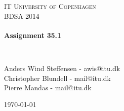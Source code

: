 


%


\begin{center}
\thispagestyle{empty}


\textsc{\LARGE IT University of Copenhagen}\\[1.5cm]

\textsc{\Large BDSA 2014 }\\[0.5cm]

\HRule \\[0.4cm]
{ \huge \bfseries Assignment 35.1 \\ [0.1cm]
    }

\HRule \\[1.5cm]

\begin{minipage}{1\textwidth}
\begin{center} \large
Anders Wind Steffensen - awis@itu.dk\\
Christopher Blundell - mail@itu.dk\\
Pierre Mandas - mail@itu.dk\\
\end{center}
\end{minipage}


\vfill

{\large \today}

\end{center}

\frontmatter%

%
%

\newpage


\mainmatter%








